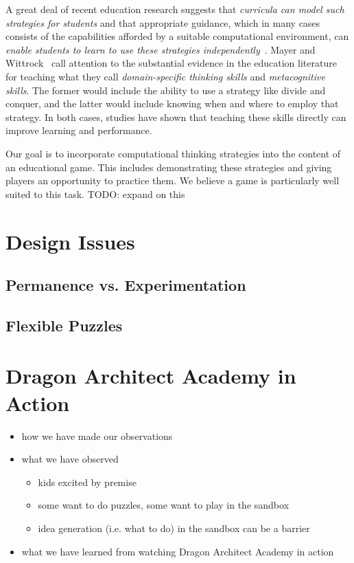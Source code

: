\documentclass{sig-alternate}
\newcommand{\TODO}[1]{{\color{red} TODO: #1}}
\newcommand{\gametitle}{{\color{RoyalPurple} Dragon Architect Academy}}
\begin{document}
A great deal of recent education research suggests that \emph{curricula can model such strategies for students} and that appropriate guidance, which in many cases consists of the capabilities afforded by a suitable computational environment, can \emph{enable students to learn to use these strategies independently}~\cite{report2010computational}. Mayer and Wittrock~\cite{mayer1996handbook} call attention to the substantial evidence in the education literature for teaching what they call \emph{domain-specific thinking skills} and \emph{metacognitive skills}. The former would include the ability to use a strategy like divide and conquer, and the latter would include knowing when and where to employ that strategy. In both cases, studies have shown that teaching these skills directly can improve learning and performance. 

Our goal is to incorporate computational thinking strategies into the content of an educational game. This includes demonstrating these strategies and giving players an opportunity to practice them. We believe a game is particularly well suited to this task. \TODO{expand on this}


\section{Design Issues}


\subsection{Permanence vs. Experimentation}

\subsection{Flexible Puzzles}


\section{\gametitle{} in Action}
\begin{itemize}
\item how we have made our observations
\item what we have observed
\begin{itemize}
\item kids excited by premise
\item some want to do puzzles, some want to play in the sandbox
\item idea generation (i.e. what to do) in the sandbox can be a barrier
\end{itemize}

\item what we have learned from watching \gametitle{} in action
\end{itemize}
\end{document}
